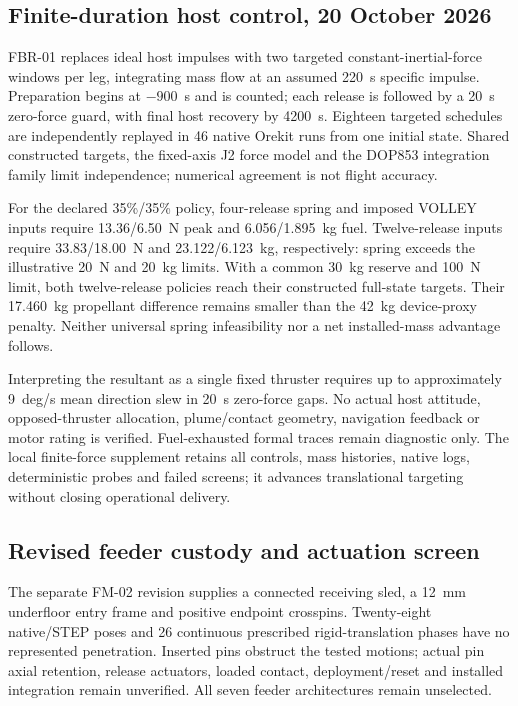 \documentclass[conference]{IEEEtran}
\begin{document}
\subsection{Finite-duration host control, 20 October 2026}
FBR-01 replaces ideal host impulses with two targeted constant-inertial-force windows per leg, integrating mass flow at an assumed 220~s specific impulse. Preparation begins at $-900$~s and is counted; each release is followed by a 20~s zero-force guard, with final host recovery by 4200~s. Eighteen targeted schedules are independently replayed in 46 native Orekit runs from one initial state. Shared constructed targets, the fixed-axis J2 force model and the DOP853 integration family limit independence; numerical agreement is not flight accuracy.

For the declared 35\%/35\% policy, four-release spring and imposed VOLLEY inputs require 13.36/6.50~N peak and 6.056/1.895~kg fuel. Twelve-release inputs require 33.83/18.00~N and 23.122/6.123~kg, respectively: spring exceeds the illustrative 20~N and 20~kg limits. With a common 30~kg reserve and 100~N limit, both twelve-release policies reach their constructed full-state targets. Their 17.460~kg propellant difference remains smaller than the 42~kg device-proxy penalty. Neither universal spring infeasibility nor a net installed-mass advantage follows.

Interpreting the resultant as a single fixed thruster requires up to approximately 9~deg/s mean direction slew in 20~s zero-force gaps. No actual host attitude, opposed-thruster allocation, plume/contact geometry, navigation feedback or motor rating is verified. Fuel-exhausted formal traces remain diagnostic only. The local finite-force supplement retains all controls, mass histories, native logs, deterministic probes and failed screens; it advances translational targeting without closing operational delivery.

\subsection{Revised feeder custody and actuation screen}
The separate FM-02 revision supplies a connected receiving sled, a 12~mm underfloor entry frame and positive endpoint crosspins. Twenty-eight native/STEP poses and 26 continuous prescribed rigid-translation phases have no represented penetration. Inserted pins obstruct the tested motions; actual pin axial retention, release actuators, loaded contact, deployment/reset and installed integration remain unverified. All seven feeder architectures remain unselected.
\end{document}

